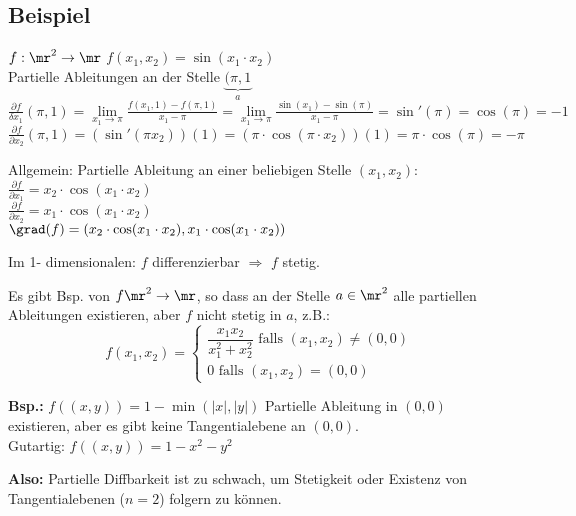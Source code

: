 \subsection{Beispiel}
	$ f:\mr^2\rightarrow\mr $ $ f(x_1,x_2)=\sin(x_1\cdot x_2) $\\
	Partielle Ableitungen an der Stelle $ \underbrace{(\pi, 1}_{a} $\\
	$ \frac{\partial f}{\delta x_1}(\pi, 1)=\lim\limits_{x_1\rightarrow\pi}\frac{f(x_1,1)-f(\pi, 1)}{x_1-\pi}=\lim\limits_{x_1\rightarrow\pi}\frac{\sin(x_1)-\sin(\pi)}{x_1-\pi}=\sin'(\pi)=\cos(\pi)=-1 $\\
	$ \frac{\partial f}{\partial x_2}(\pi, 1)=(\sin'(\pi x_2))(1)=(\pi\cdot\cos(\pi\cdot x_2))(1)=\pi\cdot\cos(\pi)=-\pi $
	
	Allgemein: Partielle Ableitung an einer beliebigen Stelle $ (x_1,x_2) $:\\
	$ \frac{\partial f}{\partial x_1}=x_2\cdot\cos(x_1\cdot x_2) $\\
	$ \frac{\partial f}{\partial x_2}=x_1\cdot\cos(x_1\cdot x_2) $\\
	$ \grad(f)=(x_2\cdot\cos(x_1\cdot x_2), x_1\cdot\cos(x_1\cdot x_2)) $
	
	Im 1- dimensionalen: $ f $ differenzierbar $ \Rightarrow $ $ f $ stetig.
	
	Es gibt Bsp. von $ f\mr^2\rightarrow\mr $, so dass an der Stelle $ a\in\mr^2 $ alle partiellen Ableitungen existieren, aber $ f $ nicht stetig in $ a $, z.B.:
	\[f(x_1,x_2)=\begin{cases}\dfrac{x_1x_2}{x_1^2+x_2^2}\mbox{ falls } (x_1,x_2)\neq(0,0)\\
	0\mbox{ falls }(x_1,x_2)=(0,0) \end{cases}\]
	
	\textbf{Bsp.:} $ f((x,y))=1-\min(|x|,|y|) $ Partielle Ableitung in $ (0,0) $ existieren, aber es gibt keine Tangentialebene an $(0,0)$.\\
	Gutartig: $ f((x,y))=1-x^2-y^2 $
	
	\textbf{Also:} Partielle Diffbarkeit ist zu schwach, um Stetigkeit oder Existenz von Tangentialebenen ($ n=2 $) folgern zu können.
	
